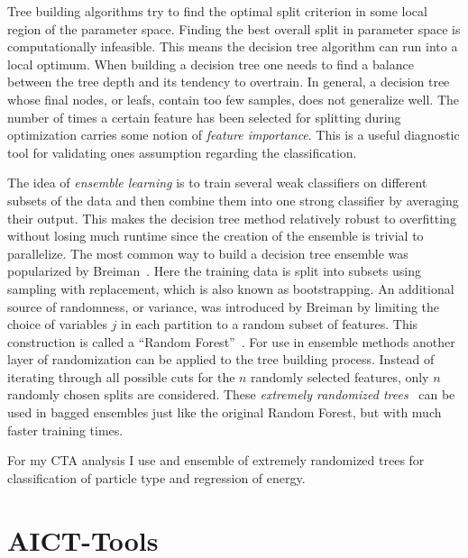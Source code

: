 Tree building algorithms try to find the optimal split criterion in some local region of the parameter space.
Finding the best overall split in parameter space is computationally infeasible.
This means the decision tree algorithm can run into a local optimum. 
When building a decision tree one needs to find a balance between the tree depth and its tendency to overtrain. 
In general, a decision tree whose final nodes, or leafs, contain too few samples, does not generalize well.
The number of times a certain feature has been selected for splitting during optimization carries some notion 
of \emph{feature importance}. This is a useful diagnostic tool for validating ones assumption regarding the classification.

The idea of \emph{ensemble learning} is to train several weak classifiers on different subsets of the data and
then combine them into one strong classifier by averaging their output.
This makes the decision tree method relatively robust to overfitting without 
losing much runtime since the creation of the ensemble is trivial to parallelize.
The most common way to build a decision tree ensemble  
was popularized by Breiman~\cite{breiman-bagging}.
Here the training data is split into subsets using sampling with replacement, which is also known as bootstrapping.
An additional source of randomness, or variance, was introduced by Breiman
by limiting the choice of variables $j$ in each partition to a random subset of features. 
This construction is called a \enquote{Random Forest}~\cite{breiman-rf}. 
For use in ensemble methods another layer of randomization can be applied to the tree building process. 
Instead of iterating through all possible cuts for the $n$ randomly selected features, only $n$ randomly chosen 
splits are considered. These \emph{extremely randomized trees}~\cite{extratrees} can be used in bagged ensembles
just like the original Random Forest, but with much faster training times. 

For my CTA analysis I use and ensemble of extremely randomized trees for classification of particle type and regression of energy. 


\section{AICT-Tools}
\label{sec:aict}

